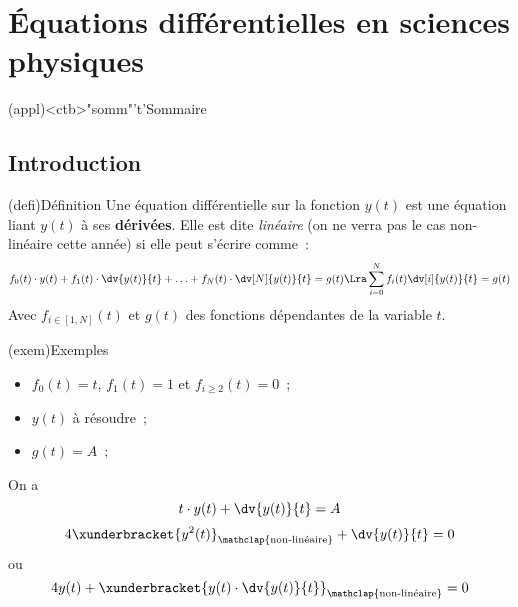 \documentclass[a4paper, 11pt, garamond]{book}
\begin{document}
\setcounter{chapter}{5}


\chapter{Équations différentielles en sciences physiques}


\begin{tcn}(appl)<ctb>"somm"'t'{Sommaire}
	\let\item\olditem
	\vspace{-15pt}
	\minitoc
	\vspace{-15pt}
\end{tcn}


\section{Introduction}
\begin{tcn}(defi){Définition}
	Une équation différentielle sur la fonction $y(t)$
	est une équation liant $y(t)$ à ses \textbf{dérivées}. Elle est dite
	\textit{linéaire} (on ne verra pas le cas
	non-linéaire cette année) si elle peut s’écrire comme~:
	\[
		f_0(t) \cdot y(t) + f_1(t) \cdot \dv{y(t)}{t} + \ldots + f_N(t) \cdot
		\dv[N]{y(t)}{t} = g(t)
		\Lra
		\sum_{i=0}^{N} f_i(t) \dv[i]{y(t)}{t} = g(t)
	\]
	Avec $f_{i \in [1,N]}(t)$ et $g(t)$ des fonctions dépendantes de la variable
	$t$.
\end{tcn}

\begin{tcn}[sidebyside, sidebyside align=top](exem){Exemples}
	\begin{itemize}
		\item $f_0(t) = t$, $f_1(t) = 1$ et $f_{i \geq 2}(t) = 0$~;
		\item $y(t)$ à résoudre~;
		\item $g(t) = A$~;
	\end{itemize}
	On a
	\[
		t \cdot y(t) + \dv{y(t)}{t} = A
	\]
	\tcblower
	\[
		4\xunderbracket{y^{2}(t)}_{\mathclap{\text{non-linéaire}}} +
		\dv{y(t)}{t} = 0
	\]
	ou
	\[
		4y(t) +
		\xunderbracket{y(t) \cdot \dv{y(t)}{t}}_{\mathclap{\text{non-linéaire}}} = 0
	\]
\end{tcn}
\end{document}
